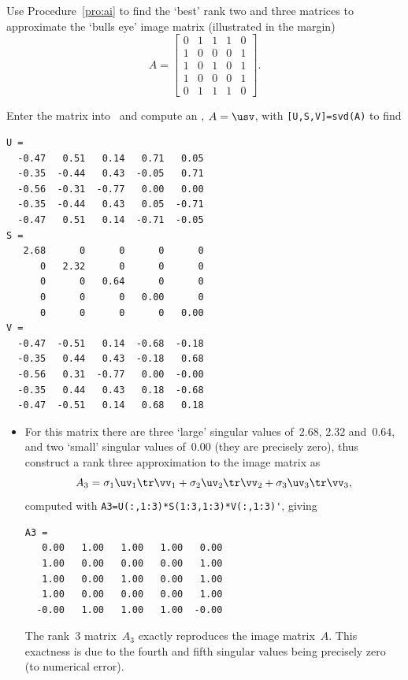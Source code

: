 \begin{example} \label{eg:bullseyemat}
Use Procedure~\ref{pro:ai} to find the `best' rank two and three matrices to approximate the `bulls eye' image matrix (illustrated in the margin)
\marginpar{}
\begin{equation*}
A=\begin{bmatrix} 0&1&1&1&0
\\1&0&0&0&1
\\1&0&1&0&1
\\1&0&0&0&1
\\0&1&1&1&0 \end{bmatrix}.
\end{equation*}
\begin{solution} 
Enter the matrix into \script\ and compute an \svd, \(A=\usv\), with \verb|[U,S,V]=svd(A)| to find \twodp
\begin{verbatim}
U =
  -0.47   0.51   0.14   0.71   0.05
  -0.35  -0.44   0.43  -0.05   0.71
  -0.56  -0.31  -0.77   0.00   0.00
  -0.35  -0.44   0.43   0.05  -0.71
  -0.47   0.51   0.14  -0.71  -0.05
S =
   2.68      0      0      0      0
      0   2.32      0      0      0
      0      0   0.64      0      0
      0      0      0   0.00      0
      0      0      0      0   0.00
V =
  -0.47  -0.51   0.14  -0.68  -0.18
  -0.35   0.44   0.43  -0.18   0.68
  -0.56   0.31  -0.77   0.00  -0.00
  -0.35   0.44   0.43   0.18  -0.68
  -0.47  -0.51   0.14   0.68   0.18
\end{verbatim}
\setbox\ajrqrbox\hbox{}%
\marginpar{\usebox{\ajrqrbox\\[2ex]}}%
\begin{itemize}
\item For this matrix there are three `large' singular values of~\(2.68\), \(2.32\) and~\(0.64\), and two `small' singular values of~\(0.00\) (they are precisely zero), thus construct a rank three approximation to the image matrix as
\begin{equation*}
A_3=\sigma_1\uv_1\tr\vv_1+\sigma_2\uv_2\tr\vv_2+\sigma_3\uv_3\tr\vv_3,
\end{equation*}
computed with \verb|A3=U(:,1:3)*S(1:3,1:3)*V(:,1:3)'|, giving \twodp
\begin{verbatim}
A3 =
   0.00   1.00   1.00   1.00   0.00
   1.00   0.00   0.00   0.00   1.00
   1.00   0.00   1.00   0.00   1.00
   1.00   0.00   0.00   0.00   1.00
  -0.00   1.00   1.00   1.00  -0.00
\end{verbatim}
The rank~3 matrix~\(A_3\) exactly reproduces the image matrix~\(A\). 
This exactness is due to the  fourth and fifth singular values being precisely zero (to numerical error).


\end{itemize}
\end{solution}
\end{example}
